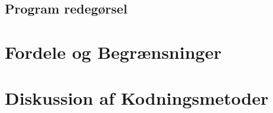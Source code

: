 \subsection{Program redegørsel}

\section{Fordele og Begrænsninger}

\section{Diskussion af Kodningsmetoder}
